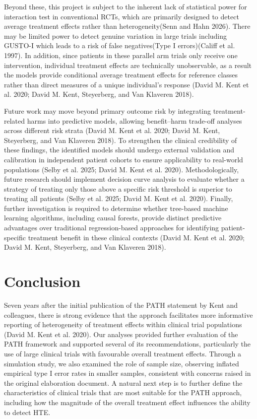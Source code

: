 \documentclass{article}
\begin{document}
Beyond these, this project is subject to the inherent lack of
statistical power for interaction test in conventional RCTs, which are
primarily designed to detect average treatment effects rather than
heterogeneity(Senn and Hahn 2026). There may be limited power to detect
genuine variation in large trials including GUSTO-I which leads to a
risk of false negatives(Type I errors)(Califf et al. 1997). In addition,
since patients in these parallel arm trials only receive one
intervention, individual treatment effects are technically unobservable,
as a result the models provide conditional average treatment effects for
reference classes rather than direct measures of a unique individual's
response (David M. Kent et al. 2020; David M. Kent, Steyerberg, and Van
Klaveren 2018).

Future work may move beyond primary outcome risk by integrating
treatment-related harms into predictive models, allowing benefit--harm
trade-off analyses across different risk strata (David M. Kent et al.
2020; David M. Kent, Steyerberg, and Van Klaveren 2018). To strengthen
the clinical credibility of these findings, the identified models should
undergo external validation and calibration in independent patient
cohorts to ensure applicability to real-world populations (Selby et al.
2025; David M. Kent et al. 2020). Methodologically, future research
should implement decision curve analysis to evaluate whether a strategy
of treating only those above a specific risk threshold is superior to
treating all patients (Selby et al. 2025; David M. Kent et al. 2020).
Finally, further investigation is required to determine whether
tree-based machine learning algorithms, including causal forests,
provide distinct predictive advantages over traditional regression-based
approaches for identifying patient-specific treatment benefit in these
clinical contexts (David M. Kent et al. 2020; David M. Kent, Steyerberg,
and Van Klaveren 2018).

\section{Conclusion}\label{conclusion}

Seven years after the initial publication of the PATH statement by Kent
and colleagues, there is strong evidence that the approach facilitates
more informative reporting of heterogeneity of treatment effects within
clinical trial populations (David M. Kent et al. 2020). Our analyses
provided further evaluation of the PATH framework and supported several
of its recommendations, particularly the use of large clinical trials
with favourable overall treatment effects. Through a simulation study,
we also examined the role of sample size, observing inflated empirical
type I error rates in smaller samples, consistent with concerns raised
in the original elaboration document. A natural next step is to further
define the characteristics of clinical trials that are most suitable for
the PATH approach, including how the magnitude of the overall treatment
effect influences the ability to detect HTE.
\end{document}
